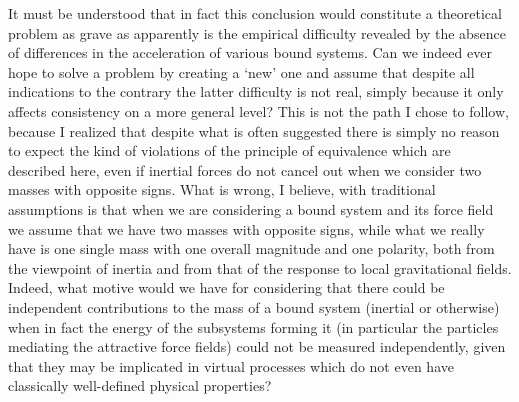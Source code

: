 \documentclass[notitlepage,12pt]{report}
\begin{document}
It must be understood that in fact this conclusion would constitute a theoretical problem as grave as apparently is the empirical difficulty revealed by the absence of differences in the acceleration of various bound systems. Can we indeed ever hope to solve a problem by creating a `new' one and assume that despite all indications to the contrary the latter difficulty is not real, simply because it only affects consistency on a more general level? This is not the path I chose to follow, because I realized that despite what is often suggested there is simply no reason to expect the kind of violations of the principle of equivalence which are described here, even if inertial forces do not cancel out when we consider two masses with opposite signs. What is wrong, I believe, with traditional assumptions is that when we are considering a bound system and its force field we assume that we have two masses with opposite signs, while what we really have is one single mass with one overall magnitude and one polarity, both from the viewpoint of inertia and from that of the response to local gravitational fields. Indeed, what motive would we have for considering that there could be independent contributions to the mass of a bound system (inertial or otherwise) when in fact the energy of the subsystems forming it (in particular the particles mediating the attractive force fields) could not be measured independently, given that they may be implicated in virtual processes which do not even have classically well-defined physical properties?
\end{document}
